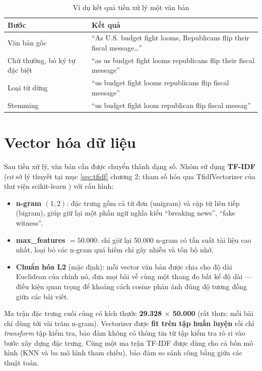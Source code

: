 \begin{table}[H]
\centering
\caption{Ví dụ kết quả tiền xử lý một văn bản}
\label{tab:vi-du-tien-xu-ly}
\begin{tabular}{|p{3.2cm}|p{10cm}|}
\hline
\textbf{Bước} & \textbf{Kết quả} \\
\hline
Văn bản gốc & ``As U.S. budget fight looms, Republicans flip their fiscal message\ldots'' \\
\hline
Chữ thường, bỏ ký tự đặc biệt & ``as us budget fight looms republicans flip their fiscal message'' \\
\hline
Loại từ dừng & ``us budget fight looms republicans flip fiscal message'' \\
\hline
Stemming & ``us budget fight loom republican flip fiscal messag'' \\
\hline
\end{tabular}
\end{table}

\section{Vector hóa dữ liệu}

Sau tiền xử lý, văn bản cần được chuyển thành dạng số. Nhóm sử dụng \textbf{TF-IDF} (cơ sở lý thuyết tại mục \ref{sec:tfidf} chương 2; tham số hóa qua TfidfVectorizer của thư viện scikit-learn \cite{sklearn}) với cấu hình:

\begin{itemize}
    \item \textbf{n-gram $(1, 2)$}: đặc trưng gồm cả từ đơn (unigram) và cặp từ liên tiếp (bigram), giúp giữ lại một phần ngữ nghĩa kiểu ``breaking news'', ``fake witness''.
    \item \textbf{max\_features $= 50.000$}: chỉ giữ lại 50.000 n-gram có tần suất tài liệu cao nhất, loại bỏ các n-gram quá hiếm chỉ gây nhiễu và tốn bộ nhớ.
    \item \textbf{Chuẩn hóa L2} (mặc định): mỗi vector văn bản được chia cho độ dài Euclidean của chính nó, đưa mọi bài về cùng một thang đo bất kể độ dài --- điều kiện quan trọng để khoảng cách cosine phản ánh đúng độ tương đồng giữa các bài viết.
\end{itemize}

Ma trận đặc trưng cuối cùng có kích thước \textbf{29.328 $\times$ 50.000} (rất thưa: mỗi bài chỉ dùng tới vài trăm n-gram). Vectorizer được \textbf{fit trên tập huấn luyện} rồi chỉ \textit{transform} tập kiểm tra, bảo đảm không có thông tin từ tập kiểm tra rò rỉ vào bước xây dựng đặc trưng. Cùng một ma trận TF-IDF được dùng cho cả bốn mô hình (KNN và ba mô hình tham chiếu), bảo đảm so sánh công bằng giữa các thuật toán.

